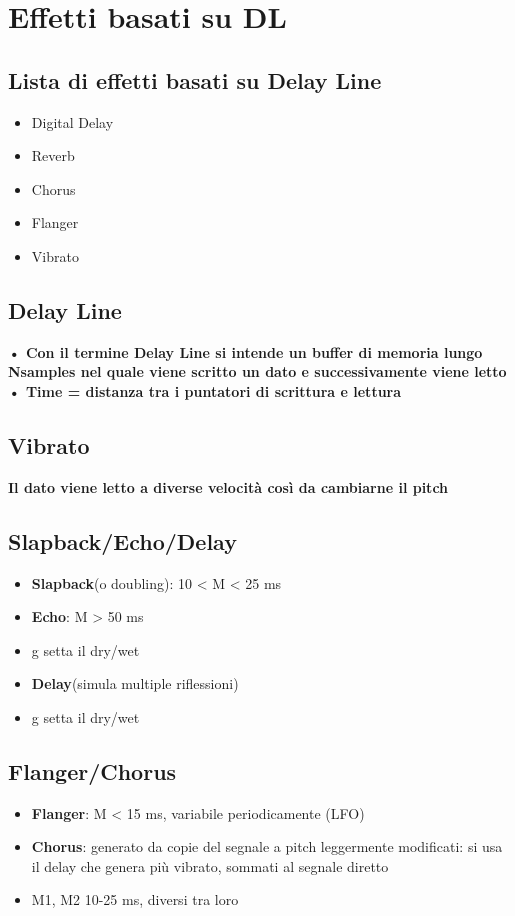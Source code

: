 \chapter{Effetti basati su DL}

\section{Lista di effetti basati su Delay Line}
\begin{itemize}
    \item Digital Delay
    \item Reverb
    \item Chorus
    \item Flanger
    \item Vibrato
\end{itemize}

\section{Delay Line}
\textbf{• Con il termine Delay Line si intende un buffer di memoria lungo Nsamples nel quale viene scritto un dato e successivamente viene letto}
\textbf{• Time = distanza tra i puntatori di scrittura e lettura}

\section{Vibrato}
\textbf{Il dato viene letto a diverse velocità così da cambiarne il pitch}

\section{Slapback/Echo/Delay}
\begin{itemize}
    \item \textbf{Slapback}(o doubling): 10 < M < 25 ms
    \item \textbf{Echo}: M > 50 ms
    \item g setta il dry/wet
\end{itemize}

\begin{itemize}
    \item \textbf{Delay}(simula multiple riflessioni)
    \item g setta il dry/wet
\end{itemize}

\section{Flanger/Chorus}
\begin{itemize}
    \item \textbf{Flanger}: M < 15 ms, variabile periodicamente (LFO)
    \item \textbf{Chorus}: generato da copie del segnale a pitch leggermente modificati: si usa il delay che genera più vibrato, sommati al segnale diretto
    \item M1, M2 10-25 ms, diversi tra loro
\end{itemize}

